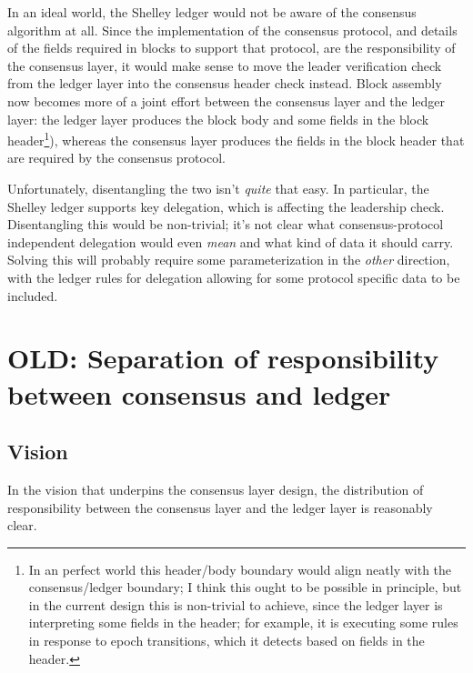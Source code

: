 In an ideal world, the Shelley ledger would not be aware of the consensus
algorithm at all. Since the implementation of the consensus protocol, and
details of the fields required in blocks to support that protocol, are the
responsibility of the consensus layer, it would make sense to move the
leader verification check from the ledger layer into the consensus header check
instead. Block assembly now becomes more of a joint effort between the
consensus layer and the ledger layer: the ledger layer produces the block body
and some fields in the block header\footnote{In an perfect world this
header/body boundary would align neatly with the consensus/ledger boundary; I
think this ought to be possible in principle, but in the current design this is
non-trivial to achieve, since the ledger layer is interpreting some fields in
the header; for example, it is executing some rules in response to epoch
transitions, which it detects based on fields in the header.}), whereas the
consensus layer produces the fields in the block header that are required by the
consensus protocol.

Unfortunately, disentangling the two isn't \emph{quite} that easy. In
particular, the Shelley ledger supports key delegation, which is affecting
the leadership check. Disentangling this would be non-trivial; it's not
clear what consensus-protocol independent delegation would even \emph{mean}
and what kind of data it should carry. Solving this will probably require
some parameterization in the \emph{other} direction, with the ledger
rules for delegation allowing for some protocol specific data to be included.



\pagebreak
\section{OLD: Separation of responsibility between consensus and ledger}

\subsection{Vision}

In the vision that underpins the consensus layer design, the distribution of
responsibility between the consensus layer and the ledger layer is reasonably
clear.

